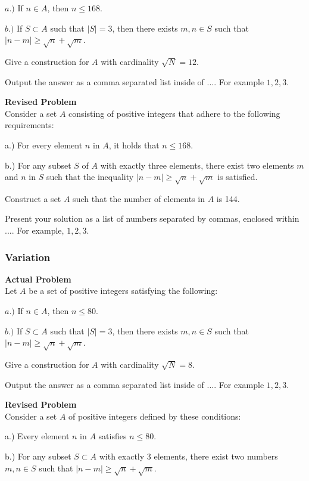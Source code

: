 $a.)$ If $n \in A$, then $n \le 168$.

$b.)$ If $S \subset A$ such that $|S|=3$, then there exists $m,n \in S$ such that $|n-m| \ge \sqrt{n}+\sqrt{m}$.

Give a construction for $A$ with cardinality $\sqrt{N}=12$.

Output the answer as a comma separated list inside of $\boxed{...}$. For example $\boxed{1, 2, 3}$.

\textbf{Revised Problem}\\
Consider a set \( A \) consisting of positive integers that adhere to the following requirements:

a.) For every element \( n \) in \( A \), it holds that \( n \le 168 \).

b.) For any subset \( S \) of \( A \) with exactly three elements, there exist two elements \( m \) and \( n \) in \( S \) such that the inequality \( |n-m| \ge \sqrt{n} + \sqrt{m} \) is satisfied.

Construct a set \( A \) such that the number of elements in \( A \) is 144.

Present your solution as a list of numbers separated by commas, enclosed within \(\boxed{...}\). For example, \(\boxed{1, 2, 3}\).

\subsubsection{Variation}
\textbf{Actual Problem}\\
Let $A$ be a set of positive integers satisfying the following:

$a.)$ If $n \in A$, then $n \le 80$.

$b.)$ If $S \subset A$ such that $|S|=3$, then there exists $m,n \in S$ such that $|n-m| \ge \sqrt{n}+\sqrt{m}$.

Give a construction for $A$ with cardinality $\sqrt{N}=8$.

Output the answer as a comma separated list inside of $\boxed{...}$. For example $\boxed{1, 2, 3}$.

\textbf{Revised Problem}\\
Consider a set \( A \) of positive integers defined by these conditions:

a.) Every element \( n \) in \( A \) satisfies \( n \le 80 \).

b.) For any subset \( S \subset A \) with exactly 3 elements, there exist two numbers \( m, n \in S \) such that \( |n-m| \ge \sqrt{n} + \sqrt{m} \).

